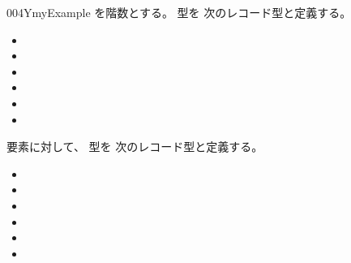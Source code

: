 \documentclass[index]{subfiles}
\begin{document}
\begin{myBlock}{004Y}{myExample}
  を階数とする。
  型を
  次のレコード型と定義する。
  \begin{itemize}
  \item {}
  \item \myInlineMath{\myRingZero \myElemOf \myRingCarrier}
  \item \myInlineMath{\myRingPlus \myElemOf
    \myRingCarrier \myFunType \myRingCarrier
    \myFunType \myRingCarrier}
  \item \myInlineMath{\myRingMinus \myElemOf
    \myRingCarrier \myFunType \myRingCarrier}
  \item \myInlineMath{\myRingOne \myElemOf \myRingCarrier}
  \item \myInlineMath{\myRingMul \myElemOf
    \myRingCarrier \myFunType \myRingCarrier
    \myFunType \myRingCarrier}
  \end{itemize}
  要素に対して、
  型を
  次のレコード型と定義する。
  \begin{itemize}
  \item {}
  \item {}
  \item {}
  \item {}
  \item {}
  \item \myInlineMath{\myBlank \myElemOf
}
\end{itemize}
\end{myBlock}
\end{document}

